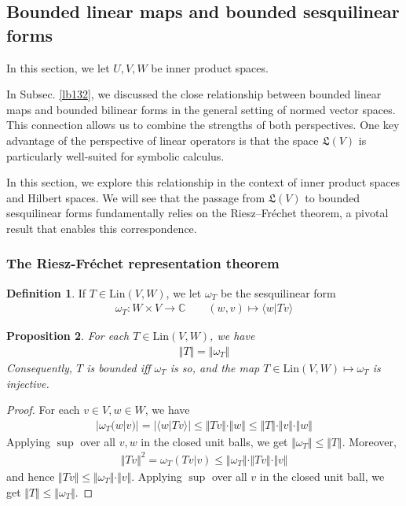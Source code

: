 \documentclass[12pt,b5paper,notitlepage]{article}
\theoremstyle{definition}
\newtheorem{df}{Definition}[section]
\theoremstyle{plain}
\newtheorem{pp}[df]{Proposition}
\newcommand{\fk}{\mathfrak}
\newcommand{\bk}[1]{\langle {#1}\rangle}
\newcommand{\Cbb}{\mathbb C}
\newcommand{\Lin}{\mathrm{Lin}}
\numberwithin{equation}{section}
\begin{document}
\subsection{Bounded linear maps and bounded sesquilinear forms}



In this section, we let $U,V,W$ be inner product spaces.



In Subsec. \ref{lb132}, we discussed the close relationship between bounded linear maps and bounded bilinear forms in the general setting of normed vector spaces. This connection allows us to combine the strengths of both perspectives. One key advantage of the perspective of linear operators is that the space $\fk L(V)$ is particularly well-suited for symbolic calculus.


In this section, we explore this relationship in the context of inner product spaces and Hilbert spaces. We will see that the passage from $\fk L(V)$ to bounded sesquilinear forms fundamentally relies on the Riesz–Fréchet theorem, a pivotal result that enables this correspondence.


\subsubsection{The Riesz-Fr\'echet representation theorem}


\begin{df}
If $T\in\Lin(V,W)$, we let $\omega_T$ be the sesquilinear form 
\begin{gather*}
\omega_T:W\times V\rightarrow\Cbb \qquad (w,v)\mapsto \bk{w|Tv}
\end{gather*}
\end{df}

\begin{pp}\label{lb133}
For each $T\in\Lin(V,W)$, we have
\begin{align*}
\Vert T\Vert=\Vert\omega_T\Vert
\end{align*}
Consequently, $T$ is bounded iff $\omega_T$ is so, and the map $T\in\Lin(V,W)\mapsto \omega_T$ is injective.
\end{pp}



\begin{proof}
For each $v\in V,w\in W$, we have
\begin{align*}
|\omega_T(w|v)|=|\bk{w|Tv}|\leq\Vert Tv\Vert\cdot\Vert w\Vert\leq \Vert T\Vert\cdot\Vert v\Vert\cdot\Vert w\Vert
\end{align*}
Applying $\sup$ over all $v,w$ in the closed unit balls, we get $\Vert\omega_T\Vert\leq\Vert T\Vert$. Moreover,
\begin{align*}
\Vert Tv\Vert^2=\omega_T(Tv|v)\leq\Vert \omega_T\Vert\cdot \Vert Tv\Vert\cdot\Vert v\Vert
\end{align*}
and hence $\Vert Tv\Vert\leq \Vert\omega_T\Vert\cdot\Vert v\Vert$. Applying $\sup$ over all $v$ in the closed unit ball, we get $\Vert T\Vert\leq\Vert\omega_T\Vert$.
\end{proof}
\end{document}
